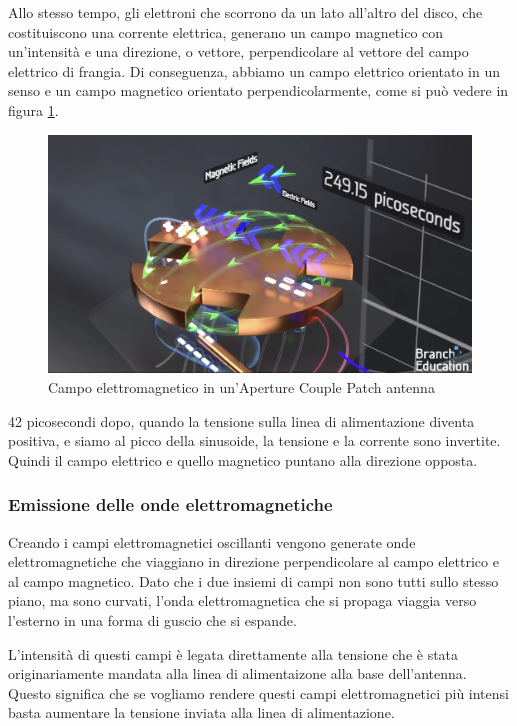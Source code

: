 Allo stesso tempo, gli elettroni che scorrono da un lato all'altro del disco, che costituiscono una corrente elettrica, generano un campo magnetico con un'intensità e una direzione, o vettore, perpendicolare al vettore del campo elettrico di frangia.
Di conseguenza, abbiamo un campo elettrico orientato in un senso e un campo magnetico orientato perpendicolarmente, come si può vedere in figura \ref{fig:aperture-couple-patch-antenna-em-field}.\cite{branch_education_how_2022}

\begin{figure}[htbp]
  \centering
  \includegraphics[width=0.8\linewidth]{./res/img/antenna_em_field.png}
  \caption{Campo elettromagnetico in un'Aperture Couple Patch antenna \cite{branch_education_how_2022}}
  \label{fig:aperture-couple-patch-antenna-em-field}
\end{figure}

42 picosecondi dopo, quando la tensione sulla linea di alimentazione diventa positiva, e siamo al picco della sinusoide, la tensione e la corrente sono invertite.
Quindi il campo elettrico e quello magnetico puntano alla direzione opposta.

\subsubsection{Emissione delle onde elettromagnetiche}
Creando i campi elettromagnetici oscillanti vengono generate onde elettromagnetiche che viaggiano in direzione perpendicolare al campo elettrico e al campo magnetico.
Dato che i due insiemi di campi non sono tutti sullo stesso piano, ma sono curvati, l'onda elettromagnetica che si propaga viaggia verso l'esterno in una forma di guscio che si espande.

L'intensità di questi campi è legata direttamente alla tensione che è stata originariamente mandata alla linea di alimentaizone alla base dell'antenna.
Questo significa che se vogliamo rendere questi campi elettromagnetici più intensi basta aumentare la tensione inviata alla linea di alimentazione.

